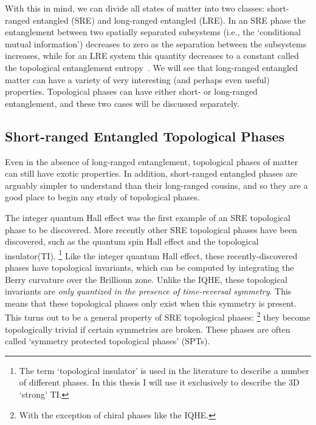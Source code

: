 With this in mind, we can divide all states of matter into two classes: short-ranged entangled (SRE) and long-ranged entangled (LRE). 
In an SRE phase the entanglement between two spatially separated subsystems (i.e., the `conditional mutual information'\cite{TurnerVishwanath2013}) decreases to zero as the separation between the subsystems increases, while for an LRE system this quantity decreases to a constant called the topological entanglement entropy~\cite{KitaevPreskill,LevinWen}. We will see that long-ranged entangled matter can have a variety of very interesting (and perhaps even useful) properties. Topological phases can have either short- or long-ranged entanglement, and these two cases will be discussed separately.

\subsection{Short-ranged Entangled Topological Phases}

Even in the absence of long-ranged entanglement, topological phases of matter can still have exotic properties. In addition, short-ranged entangled phases are arguably simpler to understand than their long-ranged cousins, and so they are a good place to begin any study of topological phases.

The integer quantum Hall effect was the first example of an SRE topological phase to be discovered. More recently other SRE topological phases have been discovered, such as the quantum spin Hall effect\cite{QSHEreview} and the topological insulator(TI).\cite{KaneHasanRMP,QiZhangRMP}
\footnote{The term `topological insulator' is used in the literature to describe a number of different phases. In this thesis I will use it exclusively to describe the 3D `strong' TI.}
Like the integer quantum Hall effect, these recently-discovered phases have topological invariants, which can be computed by integrating the Berry curvature over the Brillioun zone. Unlike the IQHE, these topological invariants are \emph{only quantized in the presence of time-reversal symmetry}. This means that these topological phases only exist when this symmetry is present. This turns out to be a general property of SRE topological phases:
\footnote{With the exception of chiral phases like the IQHE.}
 they become topologically trivial if certain symmetries are broken. These phases are often called `symmetry protected topological phases' (SPTs).

